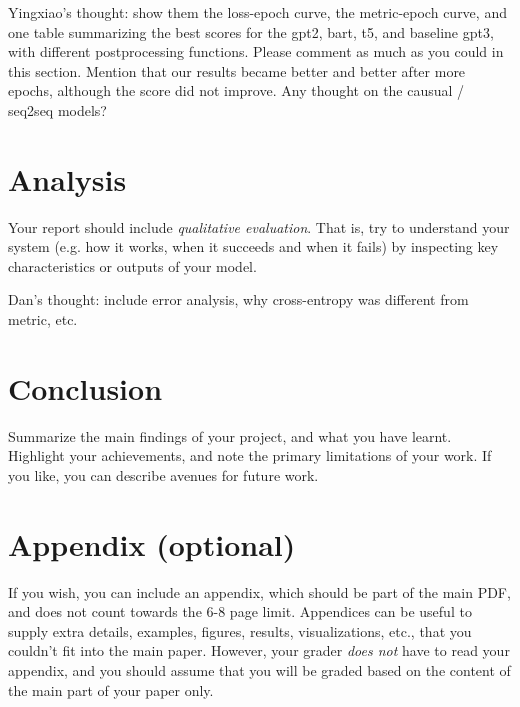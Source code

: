 \documentclass{article}
\begin{document}
Yingxiao's thought: show them the loss-epoch curve, the metric-epoch curve, and one table summarizing the best scores for the gpt2, bart, t5, and baseline gpt3, with different postprocessing functions. Please comment as much as you could in this section. Mention that our results became better and better after more epochs, although the score did not improve. Any thought on the causual / seq2seq models?


\section{Analysis}
Your report should include \textit{qualitative evaluation}. That is, try to understand your system (e.g. how it works, when it succeeds and when it fails) by inspecting key characteristics or outputs of your model.

Dan's thought: include error analysis, why cross-entropy was different from metric, etc.

\section{Conclusion}
Summarize the main findings of your project, and what you have learnt. Highlight your achievements, and note the primary limitations of your work. If you like, you can describe avenues for future work.






\appendix

\section{Appendix (optional)}
If you wish, you can include an appendix, which should be part of the main PDF, and does not count towards the 6-8 page limit.
Appendices can be useful to supply extra details, examples, figures, results, visualizations, etc., that you couldn't fit into the main paper. However, your grader \textit{does not} have to read your appendix, and you should assume that you will be graded based on the content of the main part of your paper only.
\end{document}
